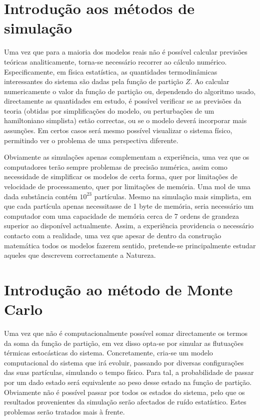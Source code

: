 \documentclass[a4paper,10pt]{article}
\begin{document}
\begin{multicols}{2}

\section{Introdução aos métodos de simulação}

Uma vez que para a maioria dos modelos reais não é possível calcular previsões teóricas analiticamente, torna-se necessário recorrer ao cálculo numérico. Especificamente, em física estatística, as quantidades termodinâmicas interessantes do sistema são dadas pela função de partição $Z$. Ao calcular numericamente o valor da função de partição ou, dependendo do algoritmo usado, directamente as quantidades em estudo, é possível verificar se as previsões da teoria (obtidas por simplificações do modelo, ou perturbações de um hamiltoniano simplista) estão correctas, ou se o modelo deverá incorporar mais assunções. Em certos casos será mesmo possível visualizar o sistema físico, permitindo ver o problema de uma perspectiva diferente.

Obviamente as simulações apenas complementam a experiência, uma vez que os computadores terão sempre problemas de precisão numérica, assim como necessidade de simplificar os modelos de certa forma, quer por limitações de velocidade de processamento, quer por limitações de memória. Uma mol de uma dada substância contém $10^{23}$ partículas. Mesmo na simulação mais simplista, em que cada partícula apenas necessitasse de 1 byte de memória, seria necessário um computador com uma capacidade de memória cerca de 7 ordens de grandeza superior ao disponível actualmente. Assim, a experiência providencia o necessário contacto com a realidade, uma vez que apesar de dentro da construção matemática todos os modelos fazerem sentido, pretende-se principalmente estudar aqueles que descrevem correctamente a Natureza.


\section{Introdução ao método de Monte Carlo}

Uma vez que não é computacionalmente possível somar directamente os termos da soma da função de partição, em vez disso opta-se por simular as flutuações térmicas estocásticas do sistema. Concretamente, cria-se um modelo computacional do sistema que irá evoluir, passando por diversas configurações das suas partículas, simulando o tempo físico. Para tal, a probabilidade de passar por um dado estado será equivalente ao peso desse estado na função de partição. Obviamente não é possível passar por todos os estados do sistema, pelo que os resultados provenientes da simulação serão afectados de ruído estatístico. Estes problemas serão tratados mais à frente. 


\end{multicols}
\end{document}
